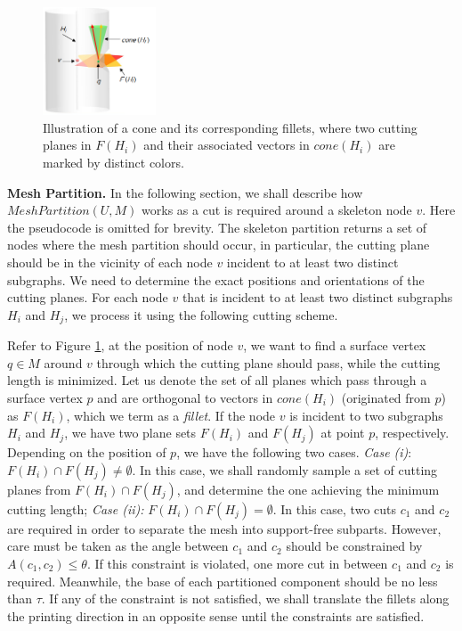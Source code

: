\begin{figure}[t]
  \centering
  \includegraphics[width=0.3\textwidth]{figs/cone-fillet.png}
  \caption{\label{fig:fillets}%
           Illustration of a cone and its corresponding fillets, where two cutting planes in $F(H_i)$ and their associated vectors in $cone(H_i)$ are marked by distinct colors.}
\end{figure}


\textbf{Mesh Partition.}
{{In the following section, we shall describe how $MeshPartition(U , M)$ works as a cut is required around a skeleton node $v$. Here the pseudocode is omitted for brevity.}}
The skeleton partition returns a set of nodes where the mesh partition should occur, in particular, the cutting plane should be in the vicinity of each node $v$ incident to at least two distinct subgraphs. We need to determine the exact positions and orientations of the cutting planes. For each node $v$ that is incident to at least two distinct subgraphs $H_i$ and $H_j$, we process it using the following cutting scheme.


Refer to Figure \ref{fig:fillets}, at the position of node $v$, we want to find a surface vertex $q \in M$ around $v$ through which the cutting plane should pass, while the cutting length is minimized. Let us denote the set of all planes which pass through a surface vertex $p$ and are orthogonal to vectors in $cone(H_i)$ (originated from $p$)  as $F(H_i)$, which we term as a \emph{fillet}. If the node $v$ is incident to two subgraphs $H_i$ and $H_j$, we have two plane sets $F(H_i)$ and $F(H_j)$ at point $p$, respectively. Depending on the position of $p$, we have the following two cases. \emph{Case (i)}: $F(H_i) \cap F(H_j) \neq \emptyset$. In this case, we shall randomly sample a set of cutting planes from $F(H_i) \cap F(H_j)$, and determine the one achieving the minimum cutting length; \emph{Case (ii):} $F(H_i) \cap F(H_j) = \emptyset$. In this case, two cuts $c_1$ and $c_2$ are required in order to separate the mesh into support-free subparts. However, care must be taken as the angle between $c_1$ and $c_2$ should be constrained by $A(c_1, c_2) \leq \theta$. If this constraint is violated, one more cut in between $c_1$ and $c_2$ is required. Meanwhile, the base of each partitioned component should be no less than $\tau$. If any of the constraint is not satisfied, we shall translate the fillets along the printing direction in an opposite sense until the constraints are satisfied.

